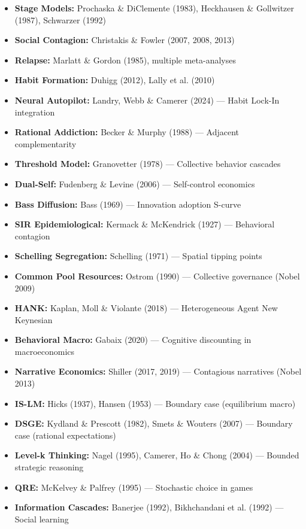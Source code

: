 \begin{itemize}[nosep]
\item \textbf{Stage Models:} Prochaska \& DiClemente (1983), Heckhausen \& Gollwitzer (1987), Schwarzer (1992)
\item \textbf{Social Contagion:} Christakis \& Fowler (2007, 2008, 2013)
\item \textbf{Relapse:} Marlatt \& Gordon (1985), multiple meta-analyses
\item \textbf{Habit Formation:} Duhigg (2012), Lally et al. (2010)
\item \textbf{Neural Autopilot:} Landry, Webb \& Camerer (2024) --- Habit Lock-In integration
\item \textbf{Rational Addiction:} Becker \& Murphy (1988) --- Adjacent complementarity
\item \textbf{Threshold Model:} Granovetter (1978) --- Collective behavior cascades
\item \textbf{Dual-Self:} Fudenberg \& Levine (2006) --- Self-control economics
\item \textbf{Bass Diffusion:} Bass (1969) --- Innovation adoption S-curve
\item \textbf{SIR Epidemiological:} Kermack \& McKendrick (1927) --- Behavioral contagion
\item \textbf{Schelling Segregation:} Schelling (1971) --- Spatial tipping points
\item \textbf{Common Pool Resources:} Ostrom (1990) --- Collective governance (Nobel 2009)
\item \textbf{HANK:} Kaplan, Moll \& Violante (2018) --- Heterogeneous Agent New Keynesian
\item \textbf{Behavioral Macro:} Gabaix (2020) --- Cognitive discounting in macroeconomics
\item \textbf{Narrative Economics:} Shiller (2017, 2019) --- Contagious narratives (Nobel 2013)
\item \textbf{IS-LM:} Hicks (1937), Hansen (1953) --- Boundary case (equilibrium macro)
\item \textbf{DSGE:} Kydland \& Prescott (1982), Smets \& Wouters (2007) --- Boundary case (rational expectations)
\item \textbf{Level-k Thinking:} Nagel (1995), Camerer, Ho \& Chong (2004) --- Bounded strategic reasoning
\item \textbf{QRE:} McKelvey \& Palfrey (1995) --- Stochastic choice in games
\item \textbf{Information Cascades:} Banerjee (1992), Bikhchandani et al. (1992) --- Social learning

\end{itemize}
